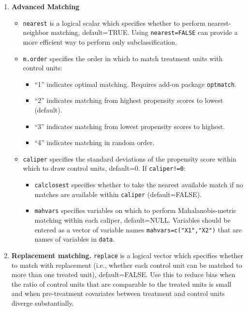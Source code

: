 \documentclass[oneside,letterpaper,titlepage]{article}
\begin{document}
\begin{enumerate}
\item \textbf{Advanced Matching}
  \begin{itemize}
  \item \texttt{nearest} is a logical scalar which specifies whether
    to perform nearest-neighbor matching, default=TRUE.  Using
    \texttt{nearest=FALSE} can provide a more efficient way to
    perform only subclassification. 
  \item \texttt{m.order}  specifies the order in which to match
    treatment units with control units:
    \begin{itemize}
    \item ``1'' indicates optimal matching.  Requires add-on package \texttt{optmatch}.
    \item ``2'' indicates matching from highest propensity scores to
      lowest (default).
    \item ``3'' indicates matching from lowest propensity scores to
      highest.
    \item ``4'' indicates matching in random order.
    \end{itemize}
  \item \texttt{caliper} specifies the standard deviations of 
    the propensity score within which to draw control units,
    default=0.  If \texttt{caliper!=0}: 
    \begin{itemize} 
    \item \texttt{calclosest} specifies whether to take the nearest
      available match if no matches are available within
      \texttt{caliper} (default=FALSE).
    \item \texttt{mahvars} specifies variables on which to perform
      Mahalanobis-metric matching within each caliper, default=NULL.
      Variables should be entered as a vector of variable names
      \texttt{mahvars=c("X1","X2")} that are names of variables in
      \texttt{data}.
    \end{itemize}
  \end{itemize}
  
\item \textbf{Replacement matching.} \texttt{replace} is a logical
  vector which specifies whether to match with replacement (i.e.,
  whether each control unit can be matched to more than one treated
  unit), default=FALSE.  Use this to reduce bias when the ratio of
  control units that are comparable to the treated units is small and
  when pre-treatment covariates between treatment and control units
  diverge substantially.
  

\end{enumerate}
\end{document}

